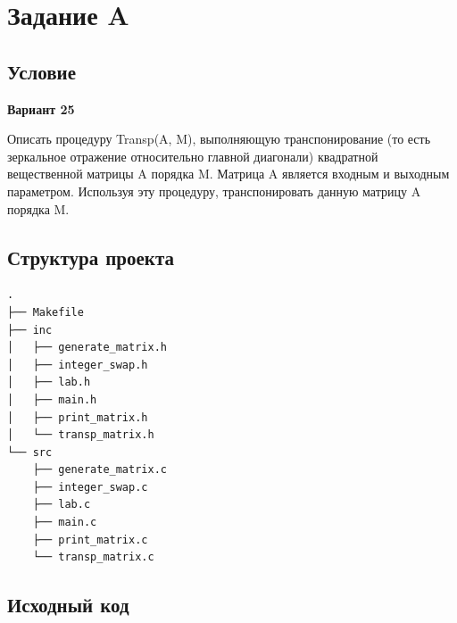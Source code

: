 \documentclass[12pt, a4paper]{article}
\begin{document}
\maketitle
\setcounter{page}{2}

\renewcommand{\contentsname}{Содержание}
\tableofcontents
\newpage

\labheading


\labreport

\section{Задание A}

\subsection{Условие}

\begin{center}
    \textbf{Вариант 25}
\end{center}

Описать процедуру Transp(A, M), выполняющую транспонирование (то есть зеркальное отражение относительно главной диагонали) квадратной вещественной матрицы A порядка M. Матрица A является входным и выходным параметром. Используя эту процедуру, транспонировать данную матрицу A порядка M.

\subsection{Структура проекта}

\begin{verbatim}
.
├── Makefile
├── inc     
│   ├── generate_matrix.h
│   ├── integer_swap.h   
│   ├── lab.h
│   ├── main.h
│   ├── print_matrix.h   
│   └── transp_matrix.h  
└── src
    ├── generate_matrix.c
    ├── integer_swap.c   
    ├── lab.c
    ├── main.c
    ├── print_matrix.c
    └── transp_matrix.c
\end{verbatim}

\subsection{Исходный код}
\end{document}
